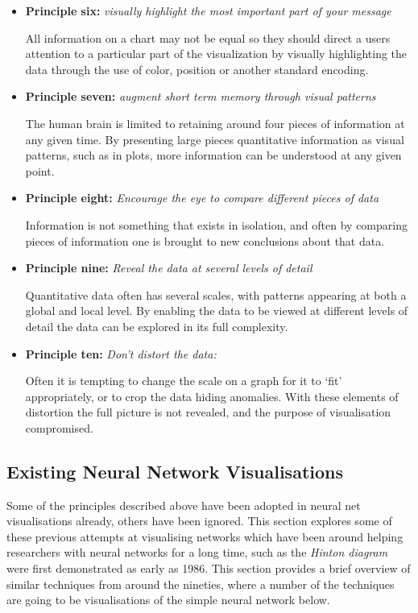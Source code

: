\documentclass[a4paper,11pt,titlepage]{article}
\begin{document}
\begin{itemize}
		\item \textbf{Principle six:} \textit{visually highlight the most important part of your message}
		\par 
		All information on a chart may not be equal so they should direct a users attention to a particular part of the visualization by visually highlighting the data through the use of color, position or another standard encoding.

		\item \textbf{Principle seven:} 
		\textit{augment short term memory through visual patterns}
		\par
		The human brain is limited to retaining around four pieces of information at any given time. By presenting large pieces quantitative information as visual patterns, such as in plots, more information can be understood at any given point.
		
	\item \textbf{Principle eight:}
	\textit{Encourage the eye to compare different pieces of data}
	\par
	Information is not something that exists in isolation, and often by comparing pieces of information one is brought to new conclusions about that data.
	\item \textbf{Principle nine:}
	\textit{Reveal the data at several levels of detail}
	\par
	Quantitative data often has several scales, with patterns appearing at both a global and local level. By enabling the data to be viewed at different levels of detail the data can be explored in its full complexity.
	\item \textbf{Principle ten:}
	\textit{Don't distort the data:}
	\par
	Often it is tempting to change the scale on a graph for it to `fit' appropriately, or to crop the data hiding anomalies. With these elements of distortion the full picture is not revealed, and the purpose of visualisation compromised. 
	\end{itemize}
\subsection{Existing Neural Network Visualisations}
		
	Some of the principles described above have been adopted in neural net visualisations already, others have been ignored. This section explores some of these previous attempts at visualising networks which have been around helping researchers with neural networks for a long time, such as the \textit{Hinton diagram} were first demonstrated as early as 1986. This section provides a brief overview of similar techniques from around the nineties, where a number of the techniques are going to be visualisations of the simple neural network below.
	 
\end{document}
